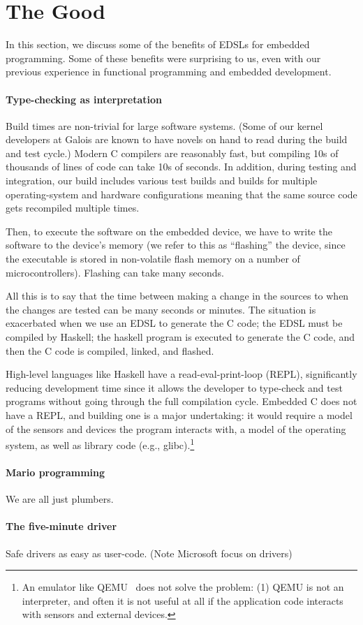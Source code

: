 \section{The Good}

In this section, we discuss some of the benefits of EDSLs for embedded
programming.  Some of these benefits were surprising to us, even with our
previous experience in functional programming and embedded development.

\paragraph{Type-checking as interpretation}
Build times are non-trivial for large software systems.  (Some of our kernel
developers at Galois are known to have novels on hand to read during the build
and test cycle.)  Modern C compilers are reasonably fast, but compiling 10s of
thousands of lines of code can take 10s of seconds.  In addition, during testing
and integration, our build includes various test builds and builds for multiple
operating-system and hardware configurations meaning that the same source code
gets recompiled multiple times.

Then, to execute the software on the embedded device, we have to write the
software to the device's memory (we refer to this as ``flashing'' the device,
since the executable is stored in non-volatile flash memory on a number of
microcontrollers).  Flashing can take many seconds.

All this is to say that the time between making a change in the sources to when
the changes are tested can be many seconds or minutes.  The situation is
exacerbated when we use an EDSL to generate the C code; the EDSL must be
compiled by Haskell; the haskell program is executed to generate the C code, and
then the C code is compiled, linked, and flashed.

High-level languages like Haskell have a read-eval-print-loop (REPL),
significantly reducing development time since it allows the developer to
type-check and test programs without going through the full compilation cycle.
Embedded C does not have a REPL, and building one is a major undertaking: it
would require a model of the sensors and devices the program interacts with, a
model of the operating system, as well as library code (e.g.,
glibc).\footnote{An emulator like QEMU~\cite{} does not solve the problem: (1)
  QEMU is not an interpreter, and often it is not useful at all if the
  application code interacts with sensors and external devices.}



\paragraph{Mario programming}
We are all just plumbers.

\paragraph{The five-minute driver}
Safe drivers as easy as user-code.  (Note Microsoft focus on drivers)



